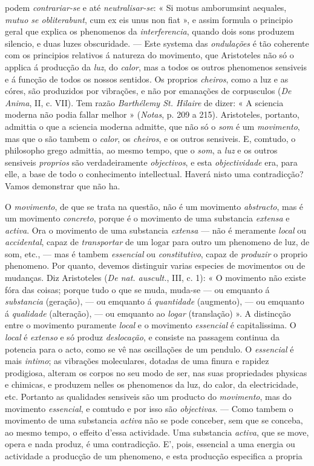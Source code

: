 podem \emph{contrariar-se} e até \emph{neutralisar-se}: « Si motus amborumsint aequales, \emph{mutuo se obliterabunt}, cum ex eis unus non fiat », e assim formula o principio geral que explica os phenomenos da \emph{interferencia}, quando dois sons produzem silencio, e duas luzes obscuridade. --- Este systema das \emph{ondulações} é tão coherente com os principios relativos á natureza do movimento, que Aristoteles não só o applica á producção da \emph{luz}, do \emph{calor}, mas a todos os outros phenomenos sensiveis e á funcção de todos os nossos sentidos. Os proprios \emph{cheiros}, como a luz e as córes, são produzidos por vibrações, e não por emanações de corpusculos (\emph{De Anima}, II, c. VII). Tem razão \emph{Barthélemy St. Hilaire} de dizer: « A sciencia moderna não podia fallar melhor » (\emph{Notas}, p. 209 a 215). Aristoteles, portanto, admittia o que a sciencia moderna admitte, que não só o \emph{som} é um \emph{movimento}, mas que o são tambem o \emph{calor}, os \emph{cheiros}, e os outros sensiveis. E, comtudo, o philosopho grego admittia, ao mesmo tempo, que o \emph{som}, a \emph{luz} e os outros sensiveis \emph{proprios} são verdadeiramente \emph{objectivos}, e esta \emph{objectividade} era, para elle, a base de todo o conhecimento intellectual. Haverá nisto uma contradicção? Vamos demonstrar que não ha.\par O \emph{movimento}, de que se trata na questão, não é um movimento \emph{abstracto}, mas é um movimento \emph{concreto}, porque é o movimento de uma substancia \emph{extensa} e \emph{activa}. Ora o movimento de uma substancia \emph{extensa} --- não é meramente \emph{local} ou \emph{accidental}, capaz de \emph{transportar} de um logar para outro um phenomeno de luz, de som, etc., --- mas é tambem \emph{essencial} ou \emph{constitutivo}, capaz de \emph{produzir} o proprio phenomeno. Por quanto, devemos distinguir varias especies de movimentos ou de mudanças. Diz Aristoteles (\emph{De nat. auscult.}, III, c. 1): « O movimento não existe fóra das coisas; porque tudo o que se muda, muda-se --- ou emquanto á \emph{substancia} (geração), --- ou emquanto á \emph{quantidade} (augmento), --- ou emquanto á \emph{qualidade} (alteração), --- ou emquanto ao \emph{logar} (translação) ». A distincção entre o movimento puramente \emph{local} e o movimento \emph{essencial} é capitalissima. O \emph{local} é \emph{extenso} e só produz \emph{deslocação}, e consiste na passagem continua da potencia para o acto, como se vê nas oscillações de um pendulo. O \emph{essencial} é mais \emph{intimo}; as vibrações moleculares, dotadas de uma finura e rapidez prodigiosa, alteram os corpos no seu modo de ser, nas suas propriedades physicas e chimicas, e produzem nelles os phenomenos da luz, do calor, da electricidade, etc. Portanto as qualidades sensiveis são um producto do \emph{movimento}, mas do movimento \emph{essencial}, e comtudo e por isso são \emph{objectivas}. --- Como tambem o movimento de uma substancia \emph{activa} não se pode conceber, sem que se conceba, ao mesmo tempo, o effeito d'essa actividade. Uma substancia \emph{activa}, que se move, opera e nada produz, é uma contradicção. E', pois, essencial a uma energia ou actividade a producção de um phenomeno, e esta producção especifica a propria 